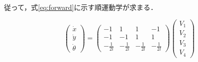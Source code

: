 従って，式\ref{eq:forward}に示す順運動学が求まる．

\begin{equation}
  \begin{pmatrix}
    \dot{x} \\
    \dot{y} \\
    \dot{\theta}
  \end{pmatrix}
  =
  \begin{pmatrix}
    -1 & 1 & 1 & -1 \\
    -1 & -1 & 1 & 1 \\
    -\frac{1}{2l} & -\frac{1}{2l} & -\frac{1}{2l} & -\frac{1}{2l}
  \end{pmatrix}
  \begin{pmatrix}
    V_{1} \\ V_{2} \\ V_{3} \\ V_{4}
  \end{pmatrix}
  \label{eq:forward}
\end{equation}